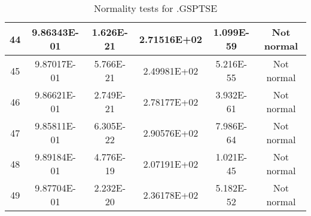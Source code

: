 \begin{table}[h]
\begin{tabular}{|c|c|c|c|c|c|}
		44 & 9.86343E-01 & 1.626E-21 & 2.71516E+02 & 1.099E-59 & Not normal\\\hline
		45 & 9.87017E-01 & 5.766E-21 & 2.49981E+02 & 5.216E-55 & Not normal\\\hline
		46 & 9.86621E-01 & 2.749E-21 & 2.78177E+02 & 3.932E-61 & Not normal\\\hline
		47 & 9.85811E-01 & 6.305E-22 & 2.90576E+02 & 7.986E-64 & Not normal\\\hline
		48 & 9.89184E-01 & 4.776E-19 & 2.07191E+02 & 1.021E-45 & Not normal\\\hline
		49 & 9.87704E-01 & 2.232E-20 & 2.36178E+02 & 5.182E-52 & Not normal\\\hline
	\end{tabular}
	\caption{Normality tests for .GSPTSE}
	\label{tab:normality_tests_GSPTSE}
\end{table}
